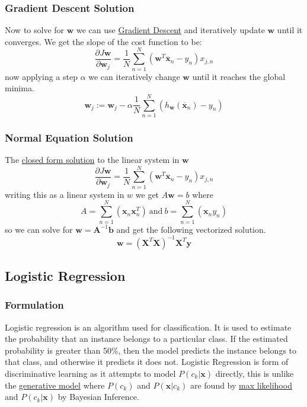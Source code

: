\documentclass[12pt]{article}
\begin{document}
        \subsubsection{Gradient Descent Solution}
            Now to solve for $\boldsymbol{w}$ we can use \hyperref[sec:GD]{Gradient Descent} and iteratively update
            $\boldsymbol{w}$ until it converges. We get the slope of the cost function to be:
            $$ \frac{\partial J{\boldsymbol{w}}}{\partial \boldsymbol{w}_j} =
            \frac{1}{N}\sum_{n=1}^N(\boldsymbol{w}^T\overline{\boldsymbol{x}}_n-y_n)x_{j,n} $$ now applying a step
            $\alpha$ we can iteratively change $\boldsymbol{w}$ until it reaches the global minima. 
            $$ \boldsymbol{w}_j := \boldsymbol{w}_j - \alpha
            \frac{1}{N}\sum_{n=1}^{N}(h_{\boldsymbol{w}}(\overline{\boldsymbol{x}}_n) - y_n) $$

        \subsubsection{Normal Equation Solution}
            The \hyperref[sec:NormalSolution]{closed form solution} to the linear system in $\boldsymbol{w}$
            $$ \frac{\partial J{\boldsymbol{w}}}{\partial \boldsymbol{w}_j} =
            \frac{1}{N}\sum_{n=1}^N(\boldsymbol{w}^T\overline{\boldsymbol{x}}_n-y_n)x_{j,n} $$ writing this as a linear
            system in $w$ we get $A\boldsymbol{w} = b$ where
            $$ A = \sum_{n=1}^N(\boldsymbol{x}_n \boldsymbol{x}_n^T) \ \textrm{and} \ b = \sum_{n=1}^N(\boldsymbol{x}_n
            y_n)
            $$ so we can solve for $\boldsymbol{w} = \boldsymbol{A}^{-1}\boldsymbol{b}$ and get the following vectorized
            solution.
            $$ \boldsymbol{w} = (\boldsymbol{X}^T\boldsymbol{X})^{-1} \boldsymbol{X}^T\boldsymbol{y} $$
    
    \subsection{Logistic Regression} \label{sec:LogisticRegression}
        \subsubsection{Formulation}
            Logistic regression is an algorithm used for classification. It is used to estimate the probability that an
            instance belongs to a particular class. If the estimated probability is greater than 50\%, then the model
            predicts the instance belongs to that class, and otherwise it predicts it does not. Logistic Regression is
            form of discriminative learning \label{fact:DiscriminativeModel} as it attempts to model
            $P(c_k|\boldsymbol{x})$ directly, this is unlike the \hyperref[fact:GenerativeModel]{generative model} where
            $P(c_k)$ and $P(\boldsymbol{x}|c_k)$ are found by \hyperref[sec:ML]{max likelihood} and
            $P(c_k|\boldsymbol{x})$ by Bayesian Inference.
\end{document}
